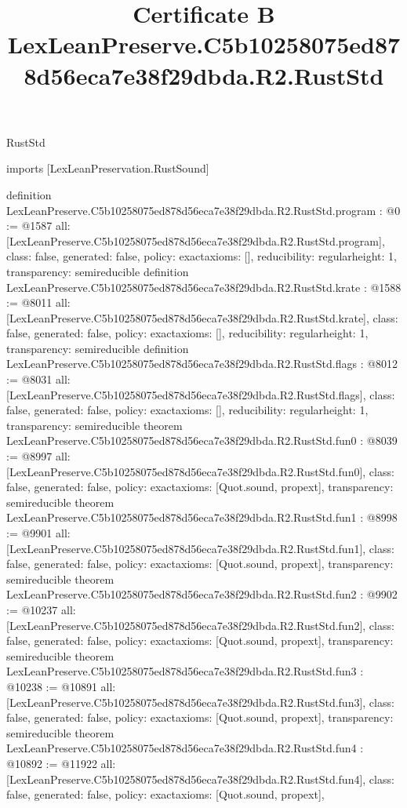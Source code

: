 \begin{lexlean}{RustStd}
\title{Certificate B LexLeanPreserve.C5b10258075ed878d56eca7e38f29dbda.R2.RustStd}
\begin{coremodule}
imports [LexLeanPreservation.RustSound]

definition LexLeanPreserve.C5b10258075ed878d56eca7e38f29dbda.R2.RustStd.program : @0 := @1587 {
  all: [LexLeanPreserve.C5b10258075ed878d56eca7e38f29dbda.R2.RustStd.program],
  class: false,
  generated: false,
  policy: exact{axioms: []},
  reducibility: regular{height: 1},
  transparency: semireducible
}
definition LexLeanPreserve.C5b10258075ed878d56eca7e38f29dbda.R2.RustStd.krate : @1588 := @8011 {
  all: [LexLeanPreserve.C5b10258075ed878d56eca7e38f29dbda.R2.RustStd.krate],
  class: false,
  generated: false,
  policy: exact{axioms: []},
  reducibility: regular{height: 1},
  transparency: semireducible
}
definition LexLeanPreserve.C5b10258075ed878d56eca7e38f29dbda.R2.RustStd.flags : @8012 := @8031 {
  all: [LexLeanPreserve.C5b10258075ed878d56eca7e38f29dbda.R2.RustStd.flags],
  class: false,
  generated: false,
  policy: exact{axioms: []},
  reducibility: regular{height: 1},
  transparency: semireducible
}
theorem LexLeanPreserve.C5b10258075ed878d56eca7e38f29dbda.R2.RustStd.fun0 : @8039 := @8997 {
  all: [LexLeanPreserve.C5b10258075ed878d56eca7e38f29dbda.R2.RustStd.fun0],
  class: false,
  generated: false,
  policy: exact{axioms: [Quot.sound, propext]},
  transparency: semireducible
}
theorem LexLeanPreserve.C5b10258075ed878d56eca7e38f29dbda.R2.RustStd.fun1 : @8998 := @9901 {
  all: [LexLeanPreserve.C5b10258075ed878d56eca7e38f29dbda.R2.RustStd.fun1],
  class: false,
  generated: false,
  policy: exact{axioms: [Quot.sound, propext]},
  transparency: semireducible
}
theorem LexLeanPreserve.C5b10258075ed878d56eca7e38f29dbda.R2.RustStd.fun2 : @9902 := @10237 {
  all: [LexLeanPreserve.C5b10258075ed878d56eca7e38f29dbda.R2.RustStd.fun2],
  class: false,
  generated: false,
  policy: exact{axioms: [Quot.sound, propext]},
  transparency: semireducible
}
theorem LexLeanPreserve.C5b10258075ed878d56eca7e38f29dbda.R2.RustStd.fun3 : @10238 := @10891 {
  all: [LexLeanPreserve.C5b10258075ed878d56eca7e38f29dbda.R2.RustStd.fun3],
  class: false,
  generated: false,
  policy: exact{axioms: [Quot.sound, propext]},
  transparency: semireducible
}
theorem LexLeanPreserve.C5b10258075ed878d56eca7e38f29dbda.R2.RustStd.fun4 : @10892 := @11922 {
  all: [LexLeanPreserve.C5b10258075ed878d56eca7e38f29dbda.R2.RustStd.fun4],
  class: false,
  generated: false,
  policy: exact{axioms: [Quot.sound, propext]},
}
\end{coremodule}
\end{lexlean}
